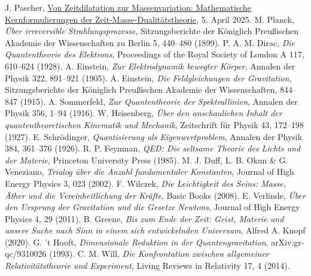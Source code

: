 \documentclass[12pt,a4paper]{article}
\begin{document}
\begin{thebibliography}{99}
 J. Pascher, \href{https://github.com/jpascher/T0-Time-Mass-Duality/tree/main/2/pdf/Deutsch/MathZeitMasseLagrange.pdf}{Von Zeitdilatation zur Massenvariation: Mathematische Kernformulierungen der Zeit-Masse-Dualitätstheorie}, 5. April 2025.
 M. Planck, \textit{Über irreversible Strahlungsprozesse}, Sitzungsberichte der Königlich Preußischen Akademie der Wissenschaften zu Berlin 5, 440–480 (1899).
 P. A. M. Dirac, \textit{Die Quantentheorie des Elektrons}, Proceedings of the Royal Society of London A 117, 610–624 (1928).
 A. Einstein, \textit{Zur Elektrodynamik bewegter Körper}, Annalen der Physik 322, 891–921 (1905).
 A. Einstein, \textit{Die Feldgleichungen der Gravitation}, Sitzungsberichte der Königlich Preußischen Akademie der Wissenschaften, 844–847 (1915).
 A. Sommerfeld, \textit{Zur Quantentheorie der Spektrallinien}, Annalen der Physik 356, 1–94 (1916).
 W. Heisenberg, \textit{Über den anschaulichen Inhalt der quantentheoretischen Kinematik und Mechanik}, Zeitschrift für Physik 43, 172–198 (1927).
 E. Schrödinger, \textit{Quantisierung als Eigenwertproblem}, Annalen der Physik 384, 361–376 (1926).
 R. P. Feynman, \textit{QED: Die seltsame Theorie des Lichts und der Materie}, Princeton University Press (1985).
 M. J. Duff, L. B. Okun \& G. Veneziano, \textit{Trialog über die Anzahl fundamentaler Konstanten}, Journal of High Energy Physics 3, 023 (2002).
 F. Wilczek, \textit{Die Leichtigkeit des Seins: Masse, Äther und die Vereinheitlichung der Kräfte}, Basic Books (2008).
 E. Verlinde, \textit{Über den Ursprung der Gravitation und die Gesetze Newtons}, Journal of High Energy Physics 4, 29 (2011).
 B. Greene, \textit{Bis zum Ende der Zeit: Geist, Materie und unsere Suche nach Sinn in einem sich entwickelnden Universum}, Alfred A. Knopf (2020).
 G. 't Hooft, \textit{Dimensionale Reduktion in der Quantengravitation}, arXiv:gr-qc/9310026 (1993).
 C. M. Will, \textit{Die Konfrontation zwischen allgemeiner Relativitätstheorie und Experiment}, Living Reviews in Relativity 17, 4 (2014).
\end{thebibliography}
\end{document}
